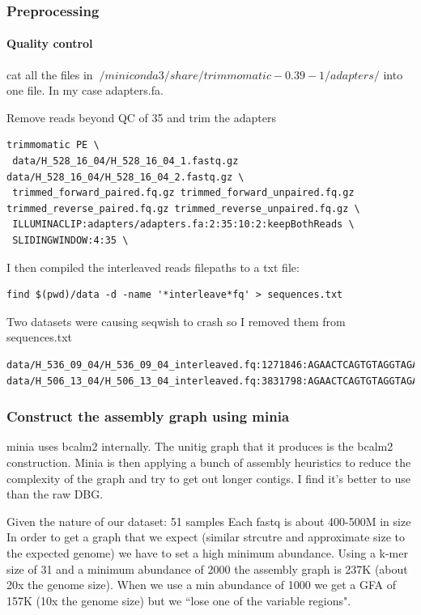 \documentclass[10pt, a4paper]{article}
\begin{document}
\subsubsection{Preprocessing}
\label{sec:orgc7e3f14}
\paragraph{Quality control}
\label{sec:org3a2a909}
cat all the files in \(~/miniconda3/share/trimmomatic-0.39-1/adapters/\) into one 
file. In my case adapters.fa.

Remove reads beyond QC of 35 and trim the adapters
\begin{verbatim}
trimmomatic PE \
 data/H_528_16_04/H_528_16_04_1.fastq.gz data/H_528_16_04/H_528_16_04_2.fastq.gz \
 trimmed_forward_paired.fq.gz trimmed_forward_unpaired.fq.gz trimmed_reverse_paired.fq.gz trimmed_reverse_unpaired.fq.gz \
 ILLUMINACLIP:adapters/adapters.fa:2:35:10:2:keepBothReads \
 SLIDINGWINDOW:4:35 \
\end{verbatim}

I then compiled the interleaved reads filepaths to a txt file:

\begin{verbatim}
find $(pwd)/data -d -name '*interleave*fq' > sequences.txt
\end{verbatim}
Two datasets were causing seqwish to crash so I removed them from sequences.txt

\begin{verbatim}
data/H_536_09_04/H_536_09_04_interleaved.fq:1271846:AGAACTCAGTGTAGGTAGAATGGTTGGCTGATCAATATCTCTAATGATTTTGGTCTGTGAATCAACTGTCATAAGAGAATTCTATCAAAGTTGAATTCCGAATCCTTGGGTCAATGACTGGGTGCACCCATTCTTCTAATGTGCTCTGTC
data/H_506_13_04/H_506_13_04_interleaved.fq:3831798:AGAACTCAGTGTAGGTAGAATGGTTGGCTGAGTAGGTAGATGGAGGCAGGTGCATGTGTGATGGGAAGTGTGGTGACGGGTTGTGTGGGCACACGGGATGAGGCGCAGATGGCTGGGGGTTTGGGAGGGGAATGGGTGGGAGAAGGAGGC
\end{verbatim}


\subsubsection{Construct the assembly graph  using minia}
\label{sec:orgf1e20ac}
minia uses bcalm2 internally. The unitig graph that it produces is the bcalm2
construction.
Minia is then applying a bunch of assembly heuristics to reduce the complexity
 of the graph and try to get out longer contigs. I find it's better to use than 
the raw DBG.

Given the nature of our dataset: 
51 samples
Each fastq is about 400-500M in size
In order to get a graph that we expect (similar strcutre and approximate size to
the expected genome) we have to set a high minimum abundance.
Using a k-mer size of 31 and a minimum abundance of 2000 the assembly graph is
237K (about 20x the genome size).  When we use a min abundance of 1000 we get a
GFA of 157K (10x the genome size) but we “lose one of the variable regions".
\end{document}
